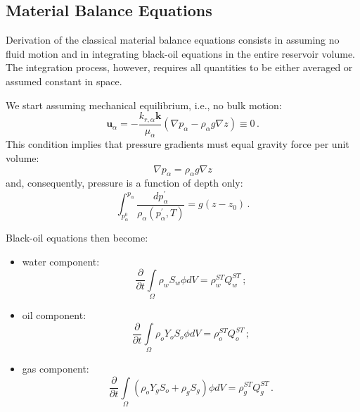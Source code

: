 \documentclass[authoryear,preprint,review,12pt]{elsarticle}
\begin{document}
\subsection{Material Balance Equations}

Derivation of the classical material balance equations consists in assuming no fluid motion and in integrating black-oil equations in the entire reservoir volume. The integration process, however, requires all quantities to be either averaged or assumed constant in space.




We start assuming mechanical equilibrium, i.e., no bulk motion:
\begin{equation}
\mathbf{u}_\alpha = -\frac{k_{r,\alpha} \mathbf{k}}{\mu_\alpha} \left(\nabla p_\alpha - \rho_\alpha g\nabla z\right)\equiv 0 \, .
\end{equation}
This condition implies that pressure gradients must equal gravity force per unit volume:
\begin{equation}\label{eq: p=rhogh}
\nabla p_\alpha = \rho_\alpha g\nabla z
\end{equation}
and, consequently, pressure is a function of depth only:
\begin{equation}\label{eq: p=rhogh}
\int_{p_\alpha^0}^{p_\alpha} \frac{dp_\alpha^{'}}{\rho_\alpha \left(p_\alpha^{'},T\right)} = g\left(z - z_0\right) \, .
\end{equation}

Black-oil equations then become:
\begin{itemize}
\item water component:
\begin{equation}\label{eq: Sw2}
\frac{\partial}{\partial t} \int\limits_{\Omega} \rho_w S_w \phi dV = \rho_w^{ST}Q_w^{ST} \, ;
\end{equation}

\item oil component:
\begin{equation}\label{eq: So2}
\frac{\partial}{\partial t} \int\limits_{\Omega} \rho_o Y_o S_o \phi dV = \rho_o^{ST}Q_o^{ST} \, ;
\end{equation}

\item gas component:
\begin{equation}\label{eq: Sg2}
\frac{\partial}{\partial t} \int\limits_{\Omega} \left( \rho_o Y_g S_o + \rho_g S_g\right) \phi dV = \rho_g^{ST}Q_g^{ST} \, .
\end{equation}
\end{itemize}
%
\end{document}
